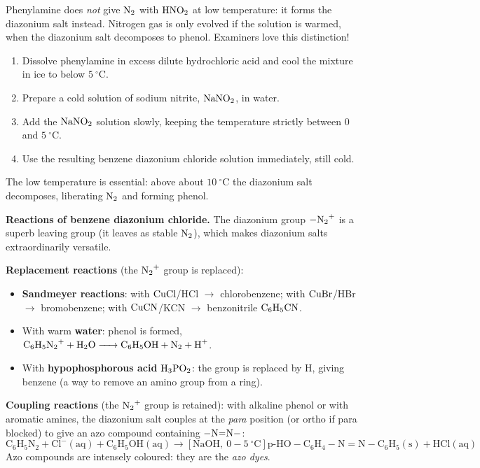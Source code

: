 \documentclass[11pt]{article}
\newcommand{\cle}[1]{{\popxbold\color{popdark}#1}}
\begin{document}
\begin{attention}
Phenylamine does \emph{not} give $\ce{N2}$ with $\ce{HNO2}$ at low temperature: it forms the diazonium salt instead. Nitrogen gas is only evolved if the solution is warmed, when the diazonium salt decomposes to phenol. Examiners love this distinction!
\end{attention}

\begin{methode}
\begin{enumerate}
\item Dissolve phenylamine in excess dilute hydrochloric acid and cool the mixture in ice to below $\SI{5}{\ensuremath{{}^{\circ}\mathrm{C}}}$.
\item Prepare a cold solution of sodium nitrite, $\ce{NaNO2}$, in water.
\item Add the $\ce{NaNO2}$ solution slowly, keeping the temperature strictly between $0$ and $\SI{5}{\ensuremath{{}^{\circ}\mathrm{C}}}$.
\item Use the resulting benzene diazonium chloride solution immediately, still cold.
\end{enumerate}
The low temperature is essential: above about $\SI{10}{\ensuremath{{}^{\circ}\mathrm{C}}}$ the diazonium salt decomposes, liberating $\ce{N2}$ and forming phenol.
\end{methode}

\textbf{Reactions of benzene diazonium chloride.} The diazonium group $\ce{-N2+}$ is a superb leaving group (it leaves as stable $\ce{N2}$), which makes diazonium salts extraordinarily versatile.

\begin{propriete}
\textbf{Replacement reactions} (the $\ce{N2+}$ group is replaced):
\begin{itemize}
\item \textbf{Sandmeyer reactions}: with $\ce{CuCl}$/HCl $\rightarrow$ chlorobenzene; with $\ce{CuBr}$/HBr $\rightarrow$ bromobenzene; with $\ce{CuCN}$/KCN $\rightarrow$ benzonitrile $\ce{C6H5CN}$.
\item With warm \textbf{water}: phenol is formed, $\ce{C6H5N2+ + H2O -> C6H5OH + N2 + H+}$.
\item With \textbf{hypophosphorous acid} $\ce{H3PO2}$: the group is replaced by H, giving benzene (a way to remove an amino group from a ring).
\end{itemize}
\textbf{Coupling reactions} (the $\ce{N2+}$ group is retained): with alkaline phenol or with aromatic amines, the diazonium salt couples at the \emph{para} position (or ortho if para blocked) to give an \cle{azo compound} containing $\ce{-N=N-}$:
\[ \ensuremath{\mathrm{C_{6}H_{5}N_{2}+Cl^{-}(aq) + C_{6}H_{5}OH(aq) \rightarrow [NaOH,\ 0-5\ ^{\circ}C] p\text{-}HO-C_{6}H_{4}-N=N-C_{6}H_{5}(s) + HCl(aq)}} \]
Azo compounds are intensely coloured: they are the \emph{azo dyes}.
\end{propriete}
\end{document}
